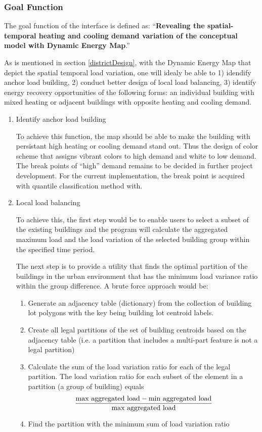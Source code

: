 \documentclass[hidelinks,12pt]{article}
\begin{document}
\subsubsection{Goal Function}
The goal function of the interface is defined as: ``\textbf{Revealing
  the spatial-temporal heating and cooling demand variation of the
  conceptual model with Dynamic Energy Map}.''

As is mentioned in section \ref{districtDesign}, with the Dynamic
Energy Map that depict the spatial temporal load variation, one will
idealy be able to 1) idendify anchor load building, 2) conduct better
design of local load balancing, 3) identify energy recovery
opportunities of the following forms: an individual building with
mixed heating or adjacent buildings with opposite heating and cooling
demand.

\begin{enumerate}[1).]
\item Identify anchor load building
  
  To achieve this function, the map should be able to make the
  building with persistant high heating or cooling demand stand
  out. Thus the design of color scheme that assigns vibrant colors to
  high demand and white to low demand. The break points of ``high''
  demand remains to be decided in further project development. For the
  current implementation, the break point is acquired with quantile
  classification method with.

\item Local load balancing
  
  To achieve this, the first step would be to enable users to select a
  subset of the existing buildings and the program will calculate the
  aggregated maximum load and the load variation of the selected
  building group within the specified time period.

  The next step is to provide a utility that finds the optimal
  partition of the buildings in the urban environment that has the
  minimum load variance ratio within the group difference. A brute
  force approach would be:

  \begin{enumerate}[{Step }I.]
  \item Generate an adjacency table (dictionary) from the collection of
    building lot polygons with the key being building lot centroid labels.
  \item Create all legal partitions of the set of building centroids
    based on the adjacency table (i.e. a partition that includes a
    multi-part feature is not a legal partition)
  \item Calculate the sum of the load variation ratio for each of the
    legal partition. The load variation ratio for each subset of the
    element in a partition (a group of building) equals
    $${\text{max aggregated load} - \text{min aggregated load} \over \text{max aggregated
      load}}$$
  \item Find the partition with the minimum sum of load variation ratio
  \end{enumerate}
  

\end{enumerate}
\end{document}
